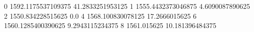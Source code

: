 0 1592.1175537109375 41.2833251953125
1 1555.4432373046875 4.6090087890625
2 1550.834228515625 0.0
4 1568.100830078125 17.2666015625
6 1560.1285400390625 9.2943115234375
8 1561.015625 10.181396484375
